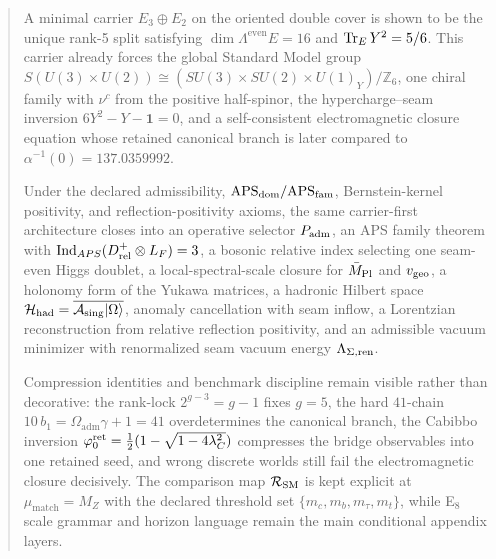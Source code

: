 
\maketitle

\begin{abstract}
A minimal carrier $E_3\oplus E_2$ on the oriented double cover is shown to be the unique rank-5 split satisfying $\dim\Lambda^{\mathrm{even}}E=16$ and $\tr_EY^2=5/6$. This carrier already forces the global Standard Model group $S(U(3)\times U(2))\cong(SU(3)\times SU(2)\times U(1)_Y)/\mathbb Z_6$, one chiral family with $\nu^c$ from the positive half-spinor, the hypercharge--seam inversion $6Y^2-Y-\mathbf 1=0$, and a self-consistent electromagnetic closure equation whose retained canonical branch is later compared to $\alpha^{-1}(0)=\num{137.0359992}$.

Under the declared admissibility, $\APSdom/\APSfam$, Bernstein-kernel positivity, and reflection-positivity axioms, the same carrier-first architecture closes into an operative selector $\Padm$, an APS family theorem with $\Ind_{APS}(D^+_{\mathrm{rel}}\otimes L_F)=3$, a bosonic relative index selecting one seam-even Higgs doublet, a local-spectral-scale closure for $\Mpl$ and $\vgeo$, a holonomy form of the Yukawa matrices, a hadronic Hilbert space $\Hhad=\overline{\Asing|\Omega\rangle}$, anomaly cancellation with seam inflow, a Lorentzian reconstruction from relative reflection positivity, and an admissible vacuum minimizer with renormalized seam vacuum energy $\Lambda_{\Seam,\mathrm{ren}}$.

Compression identities and benchmark discipline remain visible rather than decorative: the rank-lock $2^{g-3}=g-1$ fixes $g=5$, the hard $41$-chain $10\,b_1=\Omega_{\mathrm{adm}}\gamma+1=41$ overdetermines the canonical branch, the Cabibbo inversion $\phiz=\frac12(1-\sqrt{1-4\lambda_C^2})$ compresses the bridge observables into one retained seed, and wrong discrete worlds still fail the electromagnetic closure decisively. The comparison map $\mathcal R_{\SM}$ is kept explicit at $\mu_{\mathrm{match}}=M_Z$ with the declared threshold set $\{m_c,m_b,m_\tau,m_t\}$, while E$_8$ scale grammar and horizon language remain the main conditional appendix layers.
\end{abstract}

